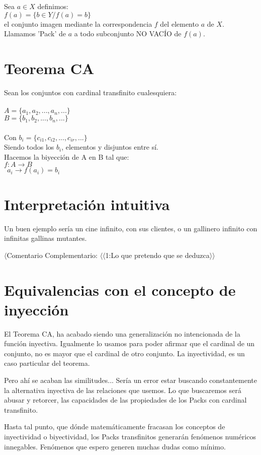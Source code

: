 \noindent 
Sea $a \in X$ definimos:\\
$f(a) = \{ b \in Y / f(a) = b \}$\\ 
el conjunto imagen mediante la correspondencia $f$ del elemento $a$ de $X$.\\

\noindent 
Llamamos 'Pack' de $a$ a todo subconjunto NO VACÍO de $f(a)$.

\newpage
\section{Teorema CA}
 
Sean los conjuntos con cardinal transfinito cualesquiera:\\\\
$A = \{ a_{1}, a_{2}, ... , a_{n}, ... \}$\\
$B = \{ b_{1}, b_{2}, ... , b_{n}, ... \}$\\\\
Con $b_{i} = \{ c_{i1}, c_{i2}, ..., c_{ir}, ... \}$ \\
Siendo todos los $b_{i}$, elementos y disjuntos entre sí.\\

Hacemos la biyección de A en B tal que:\\
$f: A \rightarrow B$\\
$\:\:a_{i} \rightarrow f(a_{i})= b_{i}$\\






\newpage
\section{Interpretación intuitiva}
Un buen ejemplo sería un cine infinito, con sus clientes, o un gallinero infinito con infinitas gallinas mutantes.

$\langle$Comentario Complementario: $\langle\langle$1:Lo que pretendo que se deduzca$\rangle\rangle$

\newpage
\section{Equivalencias con el concepto de inyección}

El Teorema CA, ha acabado siendo una generalización no intencionada de la función inyectiva. Igualmente lo usamos para poder afirmar que el cardinal de un conjunto, no es mayor que el cardinal de otro conjunto. La inyectividad, es un caso particular del teorema.

Pero ahí se acaban las similitudes... Sería un error estar buscando constantemente la alternativa inyectiva de las relaciones que usemos. Lo que buscaremos será abusar y retorcer, las capacidades de las propiedades de los Packs con cardinal transfinito.

Hasta tal punto, que dónde matemáticamente fracasan los conceptos de inyectividad o biyectividad, los Packs transfinitos generarán fenómenos numéricos innegables. Fenómenos que espero generen muchas dudas como mínimo.